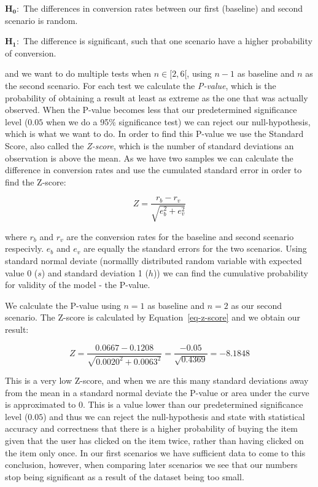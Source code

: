 $\mathbf{H_0:}$ The differences in conversion rates between our first
(baseline) and second scenario is random.

$\mathbf{H_1:}$ The difference is significant, such that one scenario have a
higher probability of conversion.

and we want to do multiple tests when $n \in [2,6[$, using $n-1$ as baseline
and $n$ as the second scenario. For each test we calculate the
\textit{P-value}, which is the probability of obtaining a result at least as
extreme as the one that was actually observed. When the P-value becomes less
that our predetermined significance level ($0.05$ when we do a 95\%
significance test) we can reject our null-hypothesis, which is what we want to
do. In order to find this P-value we use the Standard Score, also called the
\textit{Z-score}, which is the number of standard deviations an observation is
above the mean. As we have two samples we can calculate the difference in
conversion rates and use the cumulated standard error in order to find the
Z-score:

\begin{equation}
  \label{eq-z-score}
  Z = \frac{r_b - r_v}{\sqrt{e_{b}^{2} + e_{v}^{2}}}
\end{equation}

where $r_b$ and $r_v$ are the conversion rates for the baseline and second
scenario respecivly. $e_b$ and $e_v$ are equally the standard errors for the
two scenarios. Using standard normal deviate (normallly distributed random
variable with expected value 0 ($s$) and standard deviation 1 ($h$)) we can
find the cumulative probability for validity of the model - the P-value.

We calculate the P-value using $n=1$ as baseline and $n=2$ as our second
scenario. The Z-score is calculated by Equation~\ref{eq-z-score} and we obtain
our result:

\begin{equation}
  Z = \frac{0.0667-0.1208}{\sqrt{0.0020^2 + 0.0063^2}} = \frac{-0.05}{\sqrt{0.4369}} = -8.1848
\end{equation}

This is a very low Z-score, and when we are this many standard deviations away
from the mean in a standard normal deviate the P-value or area under the curve
is approximated to 0. This is a value lower than our predetermined significance
level ($0.05$) and thus we can reject the null-hypothesis and state with
statistical accuracy and correctness that there is a higher probability of
buying the item given that the user has clicked on the item twice, rather than
having clicked on the item only once. In our first scenarios we have sufficient
data to come to this conclusion, however, when comparing later scenarios we see
that our numbers stop being significant as a result of the dataset being too
small.

